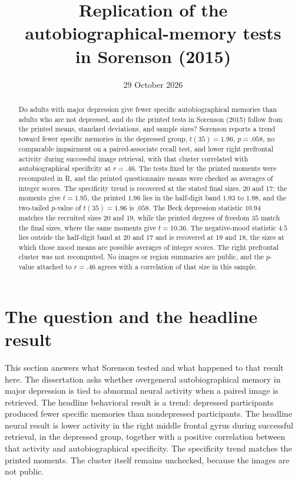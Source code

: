 \documentclass[11pt]{article}
\title{Replication of the autobiographical-memory tests\\
in Sorenson (2015)}
\author{}
\date{29 October 2026}
\begin{document}
\maketitle

\begin{abstract}
Do adults with major depression give fewer specific autobiographical memories
than adults who are not depressed, and do the printed tests in Sorenson
(2015) follow from the printed means, standard deviations, and sample sizes?
Sorenson reports a trend toward fewer specific memories in the depressed
group, \(t(35) = 1.96\), \(p = .058\), no comparable impairment on a
paired-associate recall test, and lower right prefrontal activity during
successful image retrieval, with that cluster correlated with
autobiographical specificity at \(r = .46\).
The tests fixed by the printed moments were recomputed in R, and the
printed questionnaire means were checked as averages of integer scores.
The specificity trend is recovered at the stated final sizes, 20 and 17:
the moments give \(t = 1.95\), the printed \(1.96\) lies in the half-digit
band \(1.93\) to \(1.98\), and the two-tailed \(p\)-value of \(t(35) = 1.96\)
is \(.058\).
The Beck depression statistic \(10.94\) matches the recruited sizes 20 and
19, while the printed degrees of freedom \(35\) match the final sizes, where
the same moments give \(t = 10.36\).
The negative-mood statistic \(4.5\) lies outside the half-digit band at 20
and 17 and is recovered at 19 and 18, the sizes at which those mood means
are possible averages of integer scores.
The right prefrontal cluster was not recomputed.
No images or region summaries are public, and the \(p\)-value attached to
\(r = .46\) agrees with a correlation of that size in this sample.
\end{abstract}

\section{The question and the headline result}
\label{sec:headline}

This section answers what Sorenson tested and what happened to that result
here.
The dissertation asks whether overgeneral autobiographical memory in major
depression is tied to abnormal neural activity when a paired image is
retrieved.
The headline behavioral result is a trend: depressed participants produced
fewer specific memories than nondepressed participants.
The headline neural result is lower activity in the right middle frontal
gyrus during successful retrieval, in the depressed group, together with a
positive correlation between that activity and autobiographical specificity.
The specificity trend matches the printed moments.
The cluster itself remains unchecked, because the images are not public.
\end{document}
